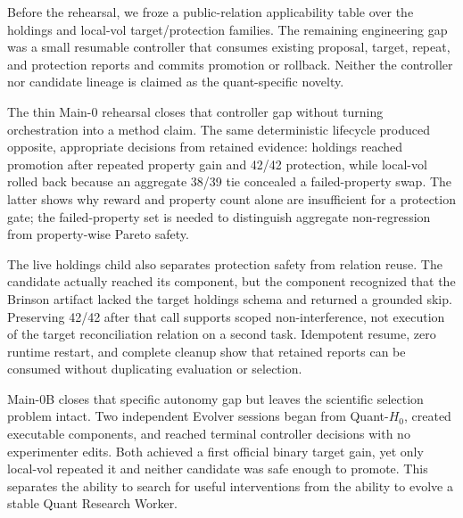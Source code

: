 Before the rehearsal, we froze a public-relation applicability table over the
holdings and local-vol target/protection families. The remaining engineering
gap was a small resumable controller that consumes existing proposal, target,
repeat, and protection reports and commits promotion or rollback. Neither the
controller nor candidate lineage is claimed as the quant-specific novelty.

The thin Main-0 rehearsal closes that controller gap without turning
orchestration into a method claim. The same deterministic lifecycle produced
opposite, appropriate decisions from retained evidence: holdings reached
promotion after repeated property gain and 42/42 protection, while local-vol
rolled back because an aggregate 38/39 tie concealed a failed-property swap.
The latter shows why reward and property count alone are insufficient for a
protection gate; the failed-property set is needed to distinguish aggregate
non-regression from property-wise Pareto safety.

The live holdings child also separates protection safety from relation reuse.
The candidate actually reached its component, but the component recognized
that the Brinson artifact lacked the target holdings schema and returned a
grounded skip. Preserving 42/42 after that call supports scoped
non-interference, not execution of the target reconciliation relation on a
second task. Idempotent resume, zero runtime restart, and complete cleanup show
that retained reports can be consumed without duplicating evaluation or
selection.


Main-0B closes that specific autonomy gap but leaves the scientific selection
problem intact. Two independent Evolver sessions began from Quant-$H_0$,
created executable components, and reached terminal controller decisions with
no experimenter edits. Both achieved a first official binary target gain, yet
only local-vol repeated it and neither candidate was safe enough to promote.
This separates the ability to search for useful interventions from the ability
to evolve a stable Quant Research Worker.

